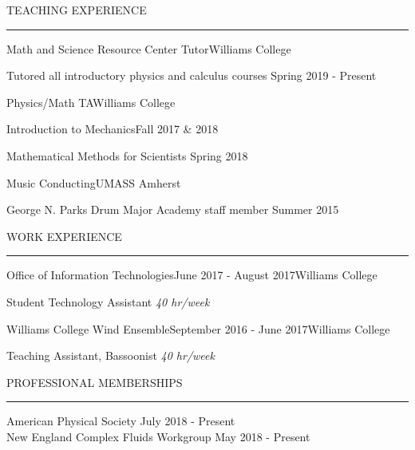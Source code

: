 \documentclass{resume} %
\renewenvironment{rSection}[1]{
	\sectionskip
	\textcolor{RoyalPurple}{\MakeUppercase{#1}}
	\sectionlineskip
	\hrule
	\begin{list}{}{
			\setlength{\leftmargin}{1.5em}
		}
		\item[]
	}{
	\end{list}
}
\begin{document}
\begin{rSection}{Teaching Experience} \itemsep -2pt
		\begin{rSubsection}{Math and Science Resource Center Tutor}{}{}{Williams College}{}
		\item {Tutored all introductory physics and calculus courses} \hfill {Spring 2019 - Present} 
	\end{rSubsection}
	\begin{rSubsection}{Physics/Math TA}{}{}{Williams College}{}
		\item {Introduction to Mechanics}\hfill{Fall 2017 \& 2018}
		\item {Mathematical Methods for Scientists} \hfill {Spring 2018} 
		\end{rSubsection}
	\begin{rSubsection}{Music Conducting}{}{}{UMASS Amherst}{}
		\item {George N. Parks Drum Major Academy staff member} \hfill {Summer 2015} 
	\end{rSubsection}
\end{rSection}




\begin{rSection}{Work Experience} \itemsep -2pt
	\begin{rSubsection}{Office of Information Technologies}{June 2017 - August 2017}{}{Williams College}{}
	\item {Student Technology Assistant} \hfill {\em 40 hr/week}
	\end{rSubsection}
	\begin{rSubsection}{Williams College Wind Ensemble}{September 2016 - June 2017}{}{Williams College}{}
	\item {Teaching Assistant, Bassoonist} \hfill {\em 40 hr/week}
	\end{rSubsection}

\end{rSection}

	\begin{rSection}{Professional Memberships} \itemsep -2pt
		{American Physical Society} \hfill {July 2018 - Present}
		\\
		{New England Complex Fluids Workgroup} \hfill {May 2018 - Present}
		
	\end{rSection}
	
\end{document}

